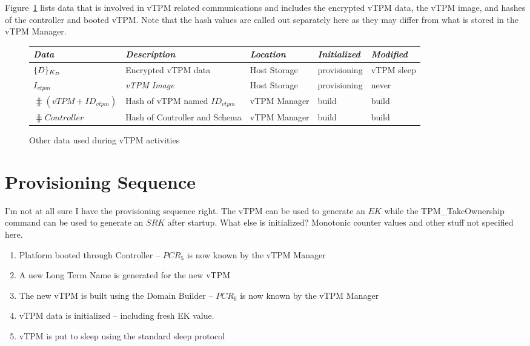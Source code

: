 \documentclass[10pt]{article}
\begin{document}
Figure~\ref{fig:other-data} lists data that is involved in vTPM
related communications and includes the encrypted vTPM data, the vTPM
image, and hashes of the controller and booted vTPM.  Note that the
hash values are called out separately here as they may differ from
what is stored in the vTPM Manager.

\begin{figure}[hbtp]
  \centering
  \begin{tabular}{lllll}
    \emph{Data} & \emph{Description} & \emph{Location} &
    \emph{Initialized} & \emph{Modified} \\ \hline
    $\{D\}_{K_D}$ & Encrypted vTPM data & Host Storage &
    provisioning & vTPM sleep \\
    $I_{vtpm}$ & \emph{vTPM Image} & Host Storage & provisioning & never
    \\
    $\hash{(vTPM+ID_{vtpm})}$ & Hash of vTPM named $ID_{vtpm}$ & vTPM
    Manager & build & build \\ 
    $\hash{Controller}$ & Hash of Controller and Schema & vTPM
    Manager & build & build \\ 
  \end{tabular}
  \caption{Other data used during vTPM activities}
  \label{fig:other-data}
\end{figure}

\section{Provisioning Sequence}

I'm not at all sure I have the provisioning sequence right.  The vTPM
can be used to generate an $EK$ while the \textsf{TPM\_TakeOwnership}
command can be used to generate an $SRK$ after startup.  What else is
initialized?  Monotonic counter values and other stuff not specified here.

\begin{enumerate}
\item Platform booted through Controller -- $PCR_5$ is now known by
  the vTPM Manager
\item A new Long Term Name is generated for the new vTPM
\item The new vTPM is built using the Domain Builder -- $PCR_6$ is now
  known by the vTPM Manager
\item vTPM data is initialized -- including fresh EK value.
\item vTPM is put to sleep using the standard sleep protocol
\end{enumerate}
\end{document}
